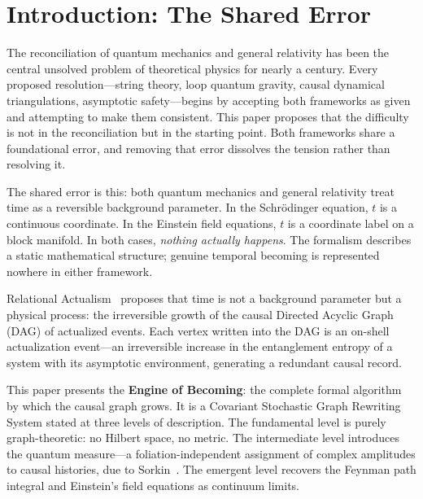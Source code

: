 \documentclass[11pt,a4paper]{article}
\theoremstyle{plain}
\theoremstyle{definition}
\theoremstyle{remark}
\begin{document}
\newpage

\section{Introduction: The Shared Error}
\label{sec:intro}

The reconciliation of quantum mechanics and general relativity has been the
central unsolved problem of theoretical physics for nearly a century. Every
proposed resolution---string theory, loop quantum gravity, causal dynamical
triangulations, asymptotic safety---begins by accepting both frameworks as given
and attempting to make them consistent. This paper proposes that the difficulty
is not in the reconciliation but in the starting point. Both frameworks share a
foundational error, and removing that error dissolves the tension rather than
resolving it.

The shared error is this: both quantum mechanics and general relativity treat
time as a reversible background parameter. In the Schr\"{o}dinger equation, $t$
is a continuous coordinate. In the Einstein field equations, $t$ is a coordinate
label on a block manifold. In both cases, \emph{nothing actually happens}. The
formalism describes a static mathematical structure; genuine temporal becoming
is represented nowhere in either framework.

Relational Actualism~\citep{Sandeman2026a} proposes that time is not a background
parameter but a physical process: the irreversible growth of the causal Directed
Acyclic Graph (DAG) of actualized events. Each vertex written into the DAG is an
on-shell actualization event---an irreversible increase in the entanglement entropy
of a system with its asymptotic environment, generating a redundant causal record.

This paper presents the \textbf{Engine of Becoming}: the complete formal algorithm
by which the causal graph grows. It is a Covariant Stochastic Graph Rewriting
System stated at three levels of description. The fundamental level is purely
graph-theoretic: no Hilbert space, no metric. The intermediate level introduces
the quantum measure---a foliation-independent assignment of complex amplitudes to
causal histories, due to Sorkin~\citep{Sorkin1994}. The emergent level recovers
the Feynman path integral and Einstein's field equations as continuum limits.
\end{document}
